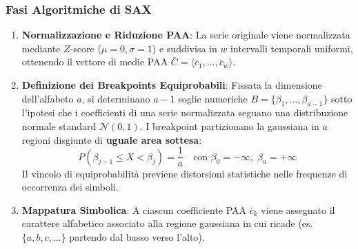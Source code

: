 \subsubsection{Fasi Algoritmiche di SAX}
\begin{enumerate}
    \item \textbf{Normalizzazione e Riduzione PAA}: La serie originale viene normalizzata mediante $Z$-score ($\mu=0, \sigma=1$) e suddivisa in $w$ intervalli temporali uniformi, ottenendo il vettore di medie PAA $\bar{C} = \langle \bar{c}_1, \dots, \bar{c}_w \rangle$.
    \item \textbf{Definizione dei Breakpoints Equiprobabili}: Fissata la dimensione dell'alfabeto $a$, si determinano $a-1$ soglie numeriche $B = \{\beta_1, \dots, \beta_{a-1}\}$ sotto l'ipotesi che i coefficienti di una serie normalizzata seguano una distribuzione normale standard $\mathcal{N}(0, 1)$. I breakpoint partizionano la gaussiana in $a$ regioni disgiunte di \textbf{uguale area sottesa}:
    \begin{equation}
    \label{eq:ts-sax-breakpoints}
    P(\beta_{j-1} \le X < \beta_j) = \frac{1}{a} \quad \text{con } \beta_0 = -\infty, \; \beta_a = +\infty
    \end{equation}
    Il vincolo di equiprobabilit\`a previene distorsioni statistiche nelle frequenze di occorrenza dei simboli.
    \item \textbf{Mappatura Simbolica}: A ciascun coefficiente PAA $\bar{c}_k$ viene assegnato il carattere alfabetico associato alla regione gaussiana in cui ricade (es. $\{a, b, c, \dots\}$ partendo dal basso verso l'alto).
\end{enumerate}

